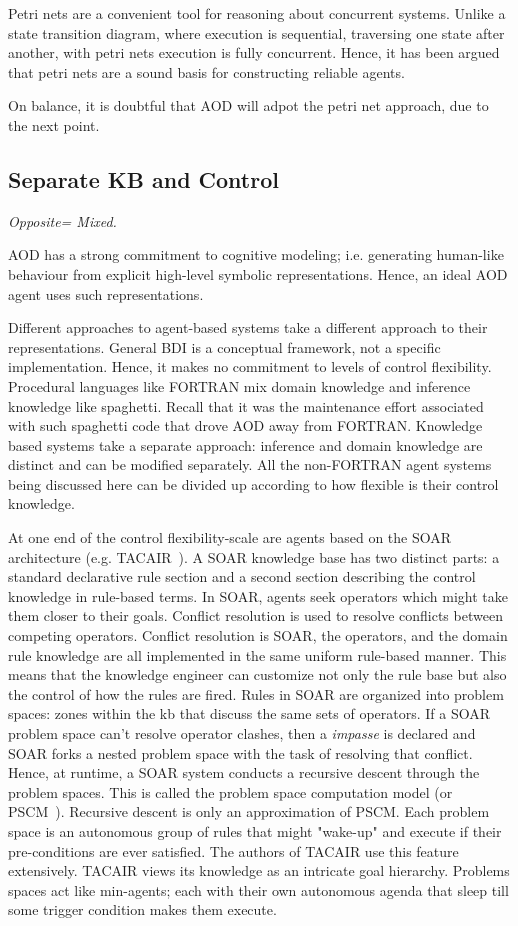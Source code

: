 Petri nets are a convenient tool for reasoning about concurrent
systems.  Unlike a state transition diagram, where execution is
sequential, traversing one state after another, with petri nets
execution is fully concurrent. Hence, it has been argued that
petri nets are a sound basis for constructing reliable agents.

On balance, it is doubtful that AOD will adpot the petri net
approach, due to the next point.

\subsection{Separate KB and Control}\label{sec:kb}

{\em Opposite= Mixed.}

AOD has a strong commitment to cognitive modeling; i.e.
generating
human-like behaviour from explicit high-level symbolic
representations. Hence, an ideal AOD agent uses such
representations.

Different approaches to agent-based systems take a different
approach to their representations. General BDI is a conceptual
framework, not a specific implementation. Hence, it makes no
commitment to levels of control flexibility. Procedural languages
like FORTRAN mix domain knowledge and inference knowledge like
spaghetti. Recall that it was the maintenance effort associated
with such spaghetti code that drove AOD away from FORTRAN.
Knowledge based systems take a separate approach: inference and
domain knowledge are distinct and can be modified separately. All
the non-FORTRAN agent systems being discussed here can be divided
up according to how flexible is their control knowledge.

At one end of the control flexibility-scale are agents based on
the SOAR architecture (e.g. TACAIR~\cite{jones99}). A SOAR
knowledge base has two distinct parts: a standard declarative rule
section and a second section describing the control knowledge in
rule-based terms. In SOAR, agents seek operators which might take
them closer to their goals. Conflict resolution  is used to
resolve conflicts between competing operators.  Conflict
resolution is SOAR,  the operators, and the domain rule knowledge
are all implemented in the same uniform rule-based manner.  This
means that the knowledge engineer can customize not only the rule
base but also the control of how the rules are fired. Rules in
SOAR are organized into problem spaces: zones within the kb that
discuss the same sets of operators. If a SOAR problem space can't
resolve operator clashes, then a {\em impasse} is declared and
SOAR forks a nested problem space with the task of resolving that
conflict. Hence, at runtime, a SOAR system conducts a recursive
descent through the problem spaces. This is called the problem
space computation model (or PSCM~\cite{yost89}).  Recursive
descent is only an approximation of PSCM. Each problem space is an
autonomous group of rules that  might "wake-up" and execute if
their pre-conditions are ever satisfied. The authors of TACAIR use
this feature extensively. TACAIR views its knowledge as an
intricate goal hierarchy.  Problems spaces act like min-agents;
each with their own autonomous agenda that sleep till some trigger
condition makes them execute.

